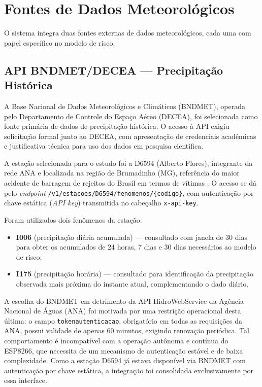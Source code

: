 \section{Fontes de Dados Meteorológicos}
\label{sec:fontes-dados}

O sistema integra duas fontes externas de dados meteorológicos,
cada uma com papel específico no modelo de risco.

\subsection{API BNDMET/DECEA — Precipitação Histórica}
\label{subsec:bndmet}

A Base Nacional de Dados Meteorológicos e Climáticos (BNDMET),
operada pelo Departamento de Controle do Espaço Aéreo (DECEA), foi
selecionada como fonte primária de dados de precipitação histórica.
O acesso à API exigiu solicitação formal junto ao DECEA, com
apresentação de credenciais acadêmicas e justificativa técnica para
uso dos dados em pesquisa científica.

A estação selecionada para o estudo foi a D6594 (Alberto Flores),
integrante da rede ANA e localizada na região de Brumadinho (MG),
referência do maior acidente de barragem de rejeitos do Brasil em
termos de vítimas \cite{robertson2019feijaoson2019}. O acesso se dá pelo
\textit{endpoint} \texttt{/v1/estacoes/D6594/fenomenos/\{codigo\}},
com autenticação por chave estática (\textit{API key}) transmitida
no cabeçalho \texttt{x-api-key}.

Foram utilizados dois fenômenos da estação:

\begin{itemize}
    \item \textbf{I006} (precipitação diária acumulada) — consultado
    com janela de 30 dias para obter os acumulados de 24 horas, 7
    dias e 30 dias necessários ao modelo de risco;

    \item \textbf{I175} (precipitação horária) — consultado para
    identificação da precipitação observada mais próxima do instante
    atual, complementando o dado diário.
\end{itemize}

A escolha do BNDMET em detrimento da API HidroWebService da Agência
Nacional de Águas (ANA) foi motivada por uma restrição operacional
desta última: o campo \texttt{tokenautenticacao}, obrigatório em todas
as requisições da ANA, possui validade de apenas 60 minutos, exigindo
renovação periódica. Tal comportamento é incompatível com a operação
autônoma e contínua do ESP8266, que necessita de um mecanismo de
autenticação estável e de baixa complexidade. Como a estação D6594
já estava disponível via BNDMET com autenticação por chave estática,
a integração foi consolidada exclusivamente por essa interface.

